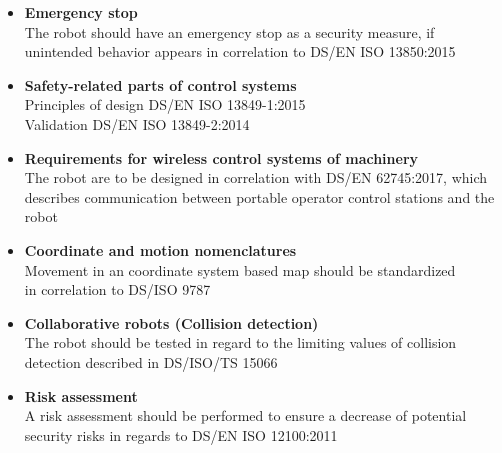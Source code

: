 \begin{itemize}
\setlength{\itemsep}{0.05\baselineskip}
\item \textbf{Emergency stop}\\
The robot should have an emergency stop as a security measure, if unintended behavior appears in correlation to DS/EN ISO 13850:2015

\item \textbf{Safety-related parts of control systems}\\
Principles of design DS/EN ISO 13849-1:2015\\
Validation DS/EN ISO 13849-2:2014

\item \textbf{Requirements for wireless control systems of machinery}\\
The robot are to be designed in correlation with DS/EN 62745:2017, which describes communication between portable operator control stations and the robot

\item \textbf{Coordinate and motion nomenclatures}\\
Movement in an coordinate system based map should be standardized\\
in correlation to DS/ISO 9787

\item \textbf{Collaborative robots (Collision detection)}\\
The robot should be tested in regard to the limiting values of collision detection described in DS/ISO/TS 15066

\item \textbf{Risk assessment}\\
A risk assessment should be performed to ensure a decrease of potential security risks in regards to DS/EN ISO 12100:2011
\end{itemize}

\newpage

